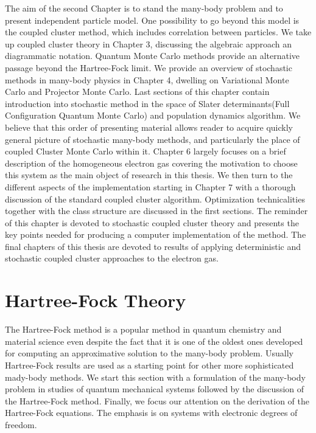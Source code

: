 \documentclass[twoside,english]{uiofysmaster}
\begin{document}
The aim of the second Chapter is to stand the many-body problem and to
present independent particle model. One possibility to go beyond this
model is the coupled cluster method, which includes correlation
between particles.  We take up coupled cluster theory in Chapter 3,
discussing the algebraic approach an diagrammatic notation.  Quantum
Monte Carlo methods provide an alternative passage beyond the
Hartree-Fock limit. We provide an overview of stochastic methods in
many-body physics in Chapter 4, dwelling on Variational Monte Carlo
and Projector Monte Carlo.  Last sections of this chapter contain
introduction into stochastic method in the space of Slater
determinants(Full Configuration Quantum Monte Carlo) and population
dynamics algorithm.  We believe that this order of presenting material
allows reader to acquire quickly general picture of stochastic
many-body methods, and particularly the place of coupled Cluster Monte
Carlo within it.  Chapter 6 largely focuses on a brief description of
the homogeneous electron gas covering the motivation to choose this
system as the main object of research in this thesis.  We then turn to
the different aspects of the implementation starting in Chapter 7 with a
thorough discussion of the standard coupled cluster algorithm.
Optimization technicalities together with the class structure are
discussed in the first sections. The reminder of this chapter is
devoted to stochastic coupled cluster theory and presents the key
points needed for producing a computer implementation of the method.
The final chapters of this thesis are devoted to results of applying
deterministic and stochastic coupled cluster approaches to the electron
gas.



\chapter{Hartree-Fock Theory}\label{Ch:HF}


The Hartree-Fock method is a popular method in quantum chemistry and
material science even despite the fact that it is one of the oldest
ones developed for computing an approximative solution to the
many-body problem. Usually Hartree-Fock results are used as a starting
point for other more sophisticated mady-body methods.  We start this
section with a formulation of the many-body problem in studies of quantum
mechanical systems followed by the discussion of the
Hartree-Fock method. Finally, we focus our attention on the derivation of the
Hartree-Fock equations.  The emphasis is on systems with electronic degrees of freedom.
\end{document}
